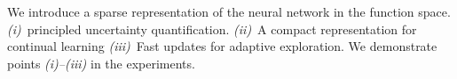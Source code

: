 \documentclass{article}
\begin{document}



We introduce a sparse representation of the neural network in the function space. 
%
{\em (i)}~principled uncertainty quantification.
{\em (ii)}~A compact representation for continual learning
{\em (iii)}~Fast updates for adaptive exploration.
%
We demonstrate points {\em(i)--(iii)} in the experiments.

\end{document}
